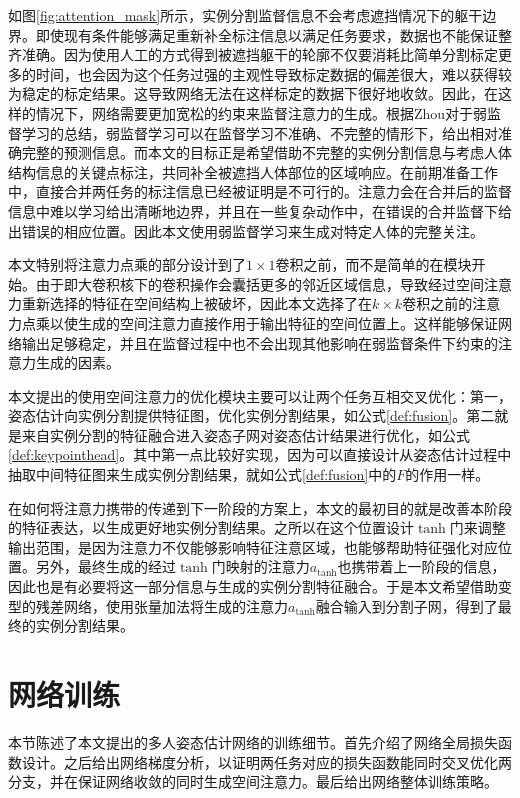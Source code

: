 如图\ref{fig:attention_mask}所示，实例分割监督信息不会考虑遮挡情况下的躯干边界。即使现有条件能够满足重新补全标注信息以满足任务要求，数据也不能保证整齐准确。因为使用人工的方式得到被遮挡躯干的轮廓不仅要消耗比简单分割标定更多的时间，也会因为这个任务过强的主观性导致标定数据的偏差很大，难以获得较为稳定的标定结果。这导致网络无法在这样标定的数据下很好地收敛。因此，在这样的情况下，网络需要更加宽松的约束来监督注意力的生成。根据Zhou对于弱监督学习的总结\cite{10.1093/nsr/nwx106}，弱监督学习可以在监督学习不准确、不完整的情形下，给出相对准确完整的预测信息。而本文的目标正是希望借助不完整的实例分割信息与考虑人体结构信息的关键点标注，共同补全被遮挡人体部位的区域响应。在前期准备工作中，直接合并两任务的标注信息已经被证明是不可行的。注意力会在合并后的监督信息中难以学习给出清晰地边界，并且在一些复杂动作中，在错误的合并监督下给出错误的相应位置。因此本文使用弱监督学习来生成对特定人体的完整关注。

本文特别将注意力点乘的部分设计到了$1\times1$卷积之前，而不是简单的在模块开始。由于即大卷积核下的卷积操作会囊括更多的邻近区域信息，导致经过空间注意力重新选择的特征在空间结构上被破坏，因此本文选择了在$k\times k$卷积之前的注意力点乘以使生成的空间注意力直接作用于输出特征的空间位置上。这样能够保证网络输出足够稳定，并且在监督过程中也不会出现其他影响在弱监督条件下约束的注意力生成的因素。

本文提出的使用空间注意力的优化模块主要可以让两个任务互相交叉优化：第一，姿态估计向实例分割提供特征图，优化实例分割结果，如公式\eqref{def:fusion}。第二就是来自实例分割的特征融合进入姿态子网对姿态估计结果进行优化，如公式\eqref{def:keypointhead}。其中第一点比较好实现，因为可以直接设计从姿态估计过程中抽取中间特征图来生成实例分割结果，就如公式\eqref{def:fusion}中的$F$的作用一样。

在如何将注意力携带的传递到下一阶段的方案上，本文的最初目的就是改善本阶段的特征表达，以生成更好地实例分割结果。之所以在这个位置设计$\tanh$门来调整输出范围，是因为注意力不仅能够影响特征注意区域，也能够帮助特征强化对应位置。另外，最终生成的经过$\tanh$门映射的注意力$a_{\tanh}$也携带着上一阶段的信息，因此也是有必要将这一部分信息与生成的实例分割特征融合。于是本文希望借助变型的残差网络，使用张量加法将生成的注意力$a_{\tanh}$融合输入到分割子网，得到了最终的实例分割结果。


\section{网络训练}
\label{sec:training}
本节陈述了本文提出的多人姿态估计网络的训练细节。首先介绍了网络全局损失函数设计。之后给出网络梯度分析，以证明两任务对应的损失函数能同时交叉优化两分支，并在保证网络收敛的同时生成空间注意力。最后给出网络整体训练策略。
